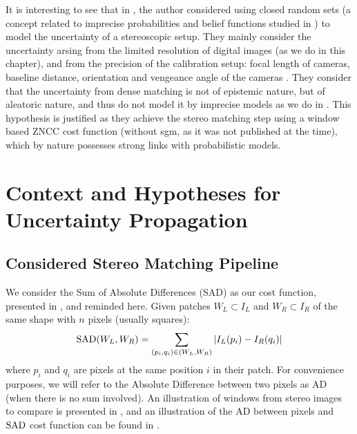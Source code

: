 \begin{remark}
    It is interesting to see that in \cite{quinio_random_1992}, the author considered using closed random sets (a concept related to imprecise probabilities and belief functions studied in  \cite{quinio_random_1991}) to model the uncertainty of a stereoscopic setup. They mainly consider the uncertainty arsing from the limited resolution of digital images (as we do in this chapter), and from the precision of the calibration setup: focal length of cameras, baseline distance, orientation and vengeance angle of the cameras \etc. They consider that the uncertainty from dense matching is not of epistemic nature, but of aleatoric nature, and thus do not model it by imprecise models as we do in . This hypothesis is justified as they achieve the stereo matching step using a window based ZNCC cost function (without \acrshort{sgm}, as it was not published at the time), which by nature possesses strong links with probabilistic models.
\end{remark}

\section{Context and Hypotheses for Uncertainty Propagation }\label{sec:sources_of_uncertainty}
\subsection{Considered Stereo Matching Pipeline}
We consider the Sum of Absolute Differences (SAD) as our cost function, presented in , and reminded here. Given patches $W_L\subset I_L$ and $W_R\subset I_R$ of the same shape with $n$ pixels (usually squares):
\begin{align}
    \mathrm{SAD}(W_L, W_R) = \sum_{(p_i, q_i)\in (W_L, W_R)}|I_L(p_i) - I_R(q_i)|\label{eq:SAD}
\end{align}
where $p_i$ and $q_i$ are pixels at the same position $i$ in their patch. For convenience purposes, we will refer to the Absolute Difference between two pixels as AD (when there is no sum involved). An illustration of windows from stereo images to compare is presented in , and an illustration of the AD between pixels and $\mathrm{SAD}$ cost function can be found in .

